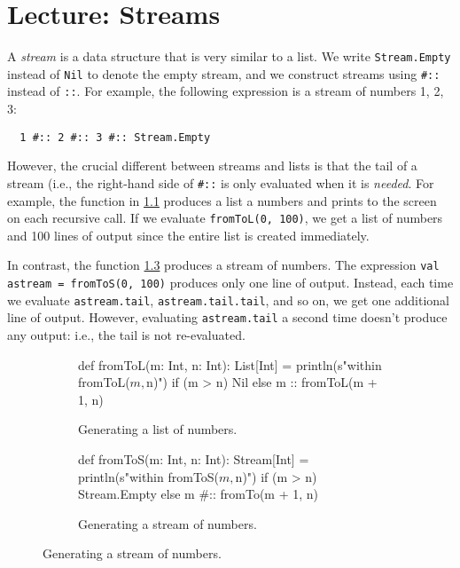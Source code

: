 \documentclass[9pt]{extbook}
\begin{document}
\chapter{Lecture: Streams}

A \emph{stream} is a data structure that is very similar to a list. We write \lstinline|Stream.Empty| instead
of \lstinline|Nil| to denote the empty stream, and we construct streams using \lstinline|#::| instead of
\lstinline|::|. For example, the following expression is a stream of numbers 1, 2, 3:

\begin{lstlisting}
  1 #:: 2 #:: 3 #:: Stream.Empty
\end{lstlisting}

However, the crucial different between streams and lists is that the tail of a stream (i.e., the right-hand side
of \lstinline|#::| is only evaluated when it is \emph{needed}. For example, the function in
\cref{fromToL} produces a list a numbers and prints to the screen on each recursive call.
If we evaluate \lstinline|fromToL(0, 100)|, we get a list of numbers and 100 lines of output
since the entire list is created immediately.

In contrast, the function \cref{fromToS} produces a
stream of numbers. The expression \lstinline|val astream = fromToS(0, 100)| produces only one
line of output. Instead, each time we evaluate \lstinline|astream.tail|, \lstinline|astream.tail.tail|,
and so on, we get one additional line of output. However, evaluating \lstinline|astream.tail| a second
time doesn't produce any output: i.e., the tail is not re-evaluated.

\begin{figure}
\begin{subfigure}{.45\textwidth}
\begin{scalacode}
def fromToL(m: Int, n: Int): List[Int] = {
  println(s"within fromToL($m, $n)")
  if (m > n)  Nil
  else m :: fromToL(m + 1, n)
}
\end{scalacode}
\caption{Generating a list of numbers.}\label{fromToL}
\end{subfigure}
  \quad
  \vrule
  \quad
  \begin{subfigure}{.45\textwidth}
\begin{scalacode}
def fromToS(m: Int, n: Int): Stream[Int] = {
  println(s"within fromToS($m, $n)")
  if (m > n) Stream.Empty
  else m #:: fromTo(m + 1, n)
}

\end{scalacode}
\caption{Generating a stream of numbers.}\label{fromToS}
  \end{subfigure}
\end{figure}
\end{document}
